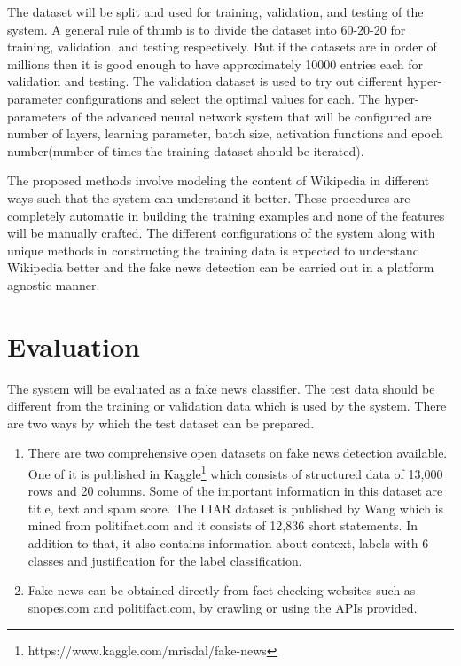 \documentclass[a4paper, 11pt]{article}
\begin{document}
The dataset will be split and used for training, validation, and testing of the system. A general rule of thumb is to divide the dataset into 60-20-20 for training, validation, and testing respectively. But if the datasets are in order of millions then it is good enough to have approximately 10000 entries each for validation and testing. The validation dataset is used to try out different hyper-parameter configurations and select the optimal values for each. The hyper-parameters of the advanced neural network system that will be configured are number of layers, learning parameter, batch size, activation functions and epoch number(number of times the training dataset should be iterated).


The proposed methods involve modeling the content of Wikipedia in different ways such that the system can understand it better. These procedures are completely automatic in building the training examples and none of the features will be manually crafted. The different configurations of the system along with unique methods in constructing the training data is expected to understand Wikipedia better and the fake news detection can be carried out in a platform agnostic manner. 

\section{Evaluation}

The system will be evaluated as a fake news classifier. The test data should be different from the training or validation data which is used by the system. There are two ways by which the test dataset can be prepared.
\begin{enumerate}
\item There are two comprehensive open datasets on fake news detection available. One of it is published in Kaggle\footnote{https://www.kaggle.com/mrisdal/fake-news} which consists of structured data of 13,000 rows and 20 columns. Some of the important information in this dataset are title, text and spam score. The LIAR dataset is published by Wang \cite{Wang2017} which is mined from politifact.com and it consists of 12,836 short statements. In addition to that, it also contains information about context, labels with 6 classes and justification for the label classification. 
\item Fake news can be obtained directly from fact checking websites such as snopes.com and politifact.com, by crawling or using the APIs provided.
\end{enumerate}
\end{document}
